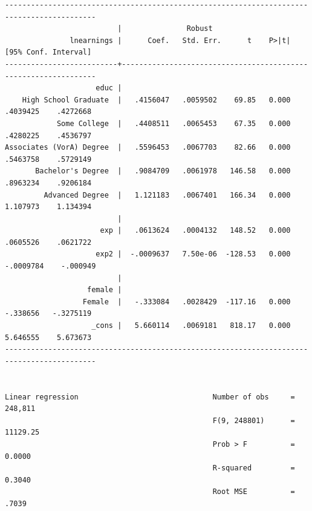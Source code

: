 \documentclass[
]{book}
\begin{document}
\begin{verbatim}
-------------------------------------------------------------------------------------------
                          |               Robust
               lnearnings |      Coef.   Std. Err.      t    P>|t|     [95% Conf. Interval]
--------------------------+----------------------------------------------------------------
                     educ |
    High School Graduate  |   .4156047   .0059502    69.85   0.000     .4039425    .4272668
            Some College  |   .4408511   .0065453    67.35   0.000     .4280225    .4536797
Associates (VorA) Degree  |   .5596453   .0067703    82.66   0.000     .5463758    .5729149
       Bachelor's Degree  |   .9084709   .0061978   146.58   0.000     .8963234    .9206184
         Advanced Degree  |   1.121183   .0067401   166.34   0.000     1.107973    1.134394
                          |
                      exp |   .0613624   .0004132   148.52   0.000     .0605526    .0621722
                     exp2 |  -.0009637   7.50e-06  -128.53   0.000    -.0009784    -.000949
                          |
                   female |
                  Female  |   -.333084   .0028429  -117.16   0.000     -.338656   -.3275119
                    _cons |   5.660114   .0069181   818.17   0.000     5.646555    5.673673
-------------------------------------------------------------------------------------------


Linear regression                               Number of obs     =    248,811
                                                F(9, 248801)      =   11129.25
                                                Prob > F          =     0.0000
                                                R-squared         =     0.3040
                                                Root MSE          =      .7039


\end{verbatim}
\end{document}
